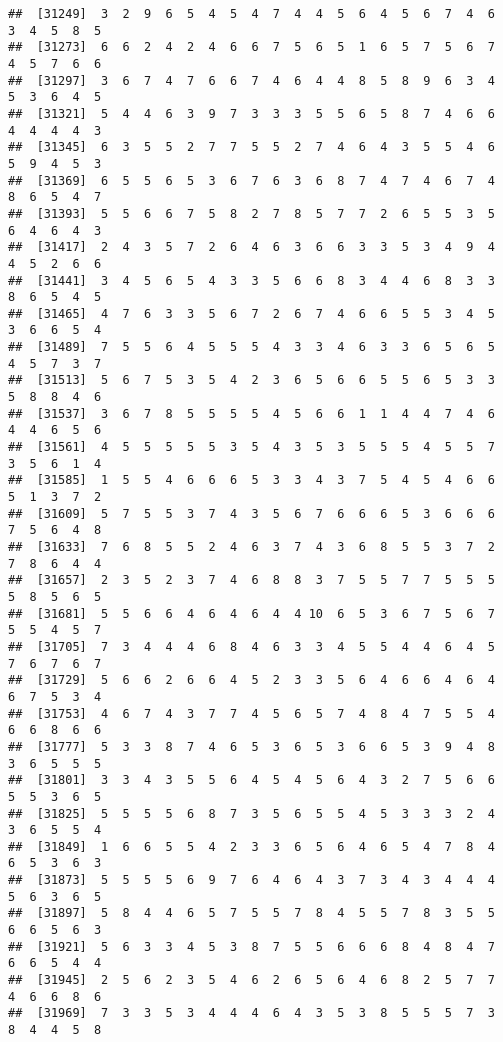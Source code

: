\documentclass[
]{book}
\begin{document}
\begin{verbatim}
##  [31249]  3  2  9  6  5  4  5  4  7  4  4  5  6  4  5  6  7  4  6  3  4  5  8  5
##  [31273]  6  6  2  4  2  4  6  6  7  5  6  5  1  6  5  7  5  6  7  4  5  7  6  6
##  [31297]  3  6  7  4  7  6  6  7  4  6  4  4  8  5  8  9  6  3  4  5  3  6  4  5
##  [31321]  5  4  4  6  3  9  7  3  3  3  5  5  6  5  8  7  4  6  6  4  4  4  4  3
##  [31345]  6  3  5  5  2  7  7  5  5  2  7  4  6  4  3  5  5  4  6  5  9  4  5  3
##  [31369]  6  5  5  6  5  3  6  7  6  3  6  8  7  4  7  4  6  7  4  8  6  5  4  7
##  [31393]  5  5  6  6  7  5  8  2  7  8  5  7  7  2  6  5  5  3  5  6  4  6  4  3
##  [31417]  2  4  3  5  7  2  6  4  6  3  6  6  3  3  5  3  4  9  4  4  5  2  6  6
##  [31441]  3  4  5  6  5  4  3  3  5  6  6  8  3  4  4  6  8  3  3  8  6  5  4  5
##  [31465]  4  7  6  3  3  5  6  7  2  6  7  4  6  6  5  5  3  4  5  3  6  6  5  4
##  [31489]  7  5  5  6  4  5  5  5  4  3  3  4  6  3  3  6  5  6  5  4  5  7  3  7
##  [31513]  5  6  7  5  3  5  4  2  3  6  5  6  6  5  5  6  5  3  3  5  8  8  4  6
##  [31537]  3  6  7  8  5  5  5  5  4  5  6  6  1  1  4  4  7  4  6  4  4  6  5  6
##  [31561]  4  5  5  5  5  5  3  5  4  3  5  3  5  5  5  4  5  5  7  3  5  6  1  4
##  [31585]  1  5  5  4  6  6  6  5  3  3  4  3  7  5  4  5  4  6  6  5  1  3  7  2
##  [31609]  5  7  5  5  3  7  4  3  5  6  7  6  6  6  5  3  6  6  6  7  5  6  4  8
##  [31633]  7  6  8  5  5  2  4  6  3  7  4  3  6  8  5  5  3  7  2  7  8  6  4  4
##  [31657]  2  3  5  2  3  7  4  6  8  8  3  7  5  5  7  7  5  5  5  5  8  5  6  5
##  [31681]  5  5  6  6  4  6  4  6  4  4 10  6  5  3  6  7  5  6  7  5  5  4  5  7
##  [31705]  7  3  4  4  4  6  8  4  6  3  3  4  5  5  4  4  6  4  5  7  6  7  6  7
##  [31729]  5  6  6  2  6  6  4  5  2  3  3  5  6  4  6  6  4  6  4  6  7  5  3  4
##  [31753]  4  6  7  4  3  7  7  4  5  6  5  7  4  8  4  7  5  5  4  6  6  8  6  6
##  [31777]  5  3  3  8  7  4  6  5  3  6  5  3  6  6  5  3  9  4  8  3  6  5  5  5
##  [31801]  3  3  4  3  5  5  6  4  5  4  5  6  4  3  2  7  5  6  6  5  5  3  6  5
##  [31825]  5  5  5  5  6  8  7  3  5  6  5  5  4  5  3  3  3  2  4  3  6  5  5  4
##  [31849]  1  6  6  5  5  4  2  3  3  6  5  6  4  6  5  4  7  8  4  6  5  3  6  3
##  [31873]  5  5  5  5  6  9  7  6  4  6  4  3  7  3  4  3  4  4  4  5  6  3  6  5
##  [31897]  5  8  4  4  6  5  7  5  5  7  8  4  5  5  7  8  3  5  5  6  6  5  6  3
##  [31921]  5  6  3  3  4  5  3  8  7  5  5  6  6  6  8  4  8  4  7  6  6  5  4  4
##  [31945]  2  5  6  2  3  5  4  6  2  6  5  6  4  6  8  2  5  7  7  4  6  6  8  6
##  [31969]  7  3  3  5  3  4  4  4  6  4  3  5  3  8  5  5  5  7  3  8  4  4  5  8

\end{verbatim}
\end{document}

